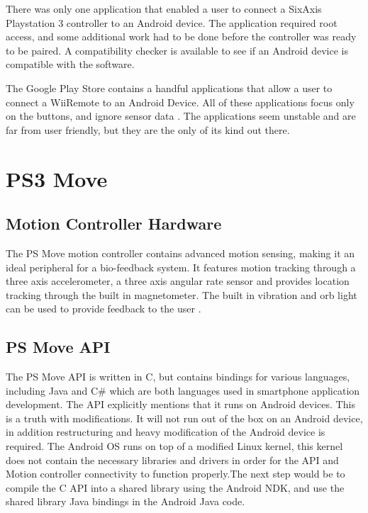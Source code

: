 There was only one application\cite{sixaxisController} that enabled a user to connect a SixAxis Playstation 3 controller to an Android device. The application required root access, and some additional work had to be done before the controller was ready to be paired. A compatibility checker is available to see if an Android device is compatible with the software.

The Google Play Store contains a handful applications that allow a user to connect a WiiRemote to an Android Device. All of these applications focus only on the buttons, and ignore sensor data \cite{wiimoteController, simpleWiiController}. The applications seem unstable and are far from user friendly, but they are the only of its kind out there.

\section{PS3 Move}

\subsection{Motion Controller Hardware}
The PS Move motion controller contains advanced motion sensing, making it an ideal peripheral for a bio-feedback system. It features motion tracking through a three axis accelerometer, a three axis angular rate sensor and provides location tracking through the built in magnetometer. The built in vibration and orb light can be used to provide feedback to the user \cite{psMoveTech}.

\subsection{PS Move API}

The PS Move API \cite{PSMoveAPI} is written in C, but contains bindings for various languages, including Java and C\# which are both languages used in smartphone application development. The API explicitly mentions that it runs on Android devices. This is a truth with modifications. It will not run out of the box on an Android device, in addition restructuring and heavy modification of the Android device is required.  The Android OS runs on top of a modified Linux kernel, this kernel does not contain the necessary libraries and drivers in order for the API and Motion controller connectivity to function properly.The next step would be to compile the C API into a shared library using the Android NDK, and use the shared library Java bindings in the Android Java code.

